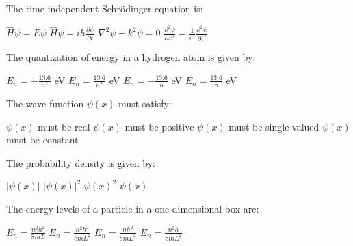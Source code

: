 \begin{question}[2]
The time-independent Schrödinger equation is:

\begin{oneparcheckboxes}
\correctchoice $\displaystyle \hat{H}\psi = E\psi$
\choice $\displaystyle \hat{H}\psi = i\hbar\frac{\partial\psi}{\partial t}$
\choice $\displaystyle \nabla^2\psi + k^2\psi = 0$
\choice $\displaystyle \frac{\partial^2\psi}{\partial x^2} = \frac{1}{v^2}\frac{\partial^2\psi}{\partial t^2}$
\end{oneparcheckboxes}
\end{question}

\begin{question}[2]
The quantization of energy in a hydrogen atom is given by:

\begin{oneparcheckboxes}
\correctchoice $\displaystyle E_n = -\frac{13.6}{n^2}$ eV
\choice $\displaystyle E_n = \frac{13.6}{n^2}$ eV
\choice $\displaystyle E_n = -\frac{13.6}{n}$ eV
\choice $\displaystyle E_n = \frac{13.6}{n}$ eV
\end{oneparcheckboxes}
\end{question}

\begin{question}[2]
The wave function $\psi(x)$ must satisfy:

\begin{oneparcheckboxes}
\choice $\psi(x)$ must be real
\choice $\psi(x)$ must be positive
\correctchoice $\psi(x)$ must be single-valued
\choice $\psi(x)$ must be constant
\end{oneparcheckboxes}
\end{question}

\begin{question}[2]
The probability density is given by:

\begin{oneparcheckboxes}
\choice $\displaystyle |\psi(x)|$
\correctchoice $\displaystyle |\psi(x)|^2$
\choice $\displaystyle \psi(x)^2$
\choice $\displaystyle \psi(x)$
\end{oneparcheckboxes}
\end{question}

\begin{question}[2]
The energy levels of a particle in a one-dimensional box are:

\begin{oneparcheckboxes}
\choice $E_n = \frac{n^2h^2}{8mL}$
\correctchoice $E_n = \frac{n^2h^2}{8mL^2}$
\choice $E_n = \frac{nh^2}{8mL^2}$
\choice $E_n = \frac{n^2h}{8mL^2}$
\end{oneparcheckboxes}
\end{question}

